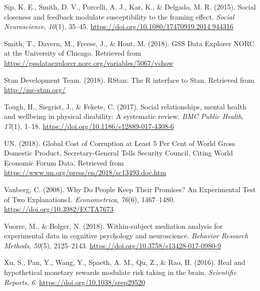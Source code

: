 \documentclass[12pt,]{article}
\begin{document}
\leavevmode\hypertarget{ref-Sip2015}{}%
Sip, K. E., Smith, D. V., Porcelli, A. J., Kar, K., \& Delgado, M. R.
(2015). Social closeness and feedback modulate susceptibility to the
framing effect. \emph{Social Neuroscience}, \emph{10}(1), 35--45.
\url{https://doi.org/10.1080/17470919.2014.944316}

\leavevmode\hypertarget{ref-GSS2018}{}%
Smith, T., Davern, M., Freese, J., \& Hout, M. (2018). GSS Data Explorer
\textbar{} NORC at the University of Chicago. Retrieved from
\url{https://gssdataexplorer.norc.org/variables/5067/vshow}

\leavevmode\hypertarget{ref-Rstan2018}{}%
Stan Development Team. (2018). RStan: The R interface to Stan. Retrieved
from \url{http://mc-stan.org/}

\leavevmode\hypertarget{ref-Tough2017}{}%
Tough, H., Siegrist, J., \& Fekete, C. (2017). Social relationships,
mental health and wellbeing in physical disability: A systematic review.
\emph{BMC Public Health}, \emph{17}(1), 1--18.
\url{https://doi.org/10.1186/s12889-017-4308-6}

\leavevmode\hypertarget{ref-UN2018}{}%
UN. (2018). Global Cost of Corruption at Least 5 Per Cent of World Gross
Domestic Product, Secretary-General Tells Security Council, Citing World
Economic Forum Data. Retrieved from
\url{https://www.un.org/press/en/2018/sc13493.doc.htm}

\leavevmode\hypertarget{ref-Vanberg2008}{}%
Vanberg, C. (2008). Why Do People Keep Their Promises? An Experimental
Test of Two Explanations1. \emph{Econometrica}, \emph{76}(6),
1467--1480. \url{https://doi.org/10.3982/ECTA7673}

\leavevmode\hypertarget{ref-Vuorre2018}{}%
Vuorre, M., \& Bolger, N. (2018). Within-subject mediation analysis for
experimental data in cognitive psychology and neuroscience.
\emph{Behavior Research Methods}, \emph{50}(5), 2125--2143.
\url{https://doi.org/10.3758/s13428-017-0980-9}

\leavevmode\hypertarget{ref-Xu2016}{}%
Xu, S., Pan, Y., Wang, Y., Spaeth, A. M., Qu, Z., \& Rao, H. (2016).
Real and hypothetical monetary rewards modulate risk taking in the
brain. \emph{Scientific Reports}, \emph{6}.
\url{https://doi.org/10.1038/srep29520}
\end{document}
